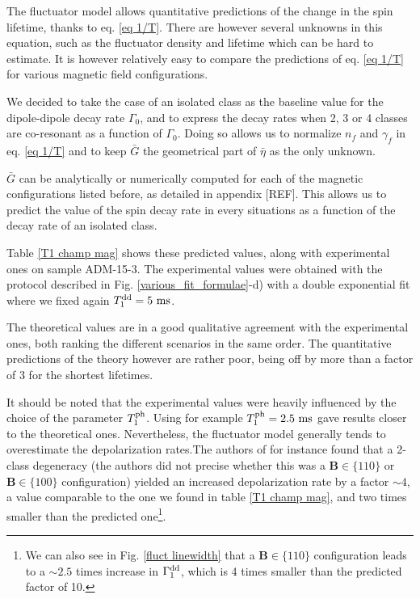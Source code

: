 \documentclass[a4paper, 11pt]{book}
\begin{document}
The fluctuator model allows quantitative predictions of the change in the spin lifetime, thanks to eq. \ref{eq 1/T}. There are however several unknowns in this equation, such as the fluctuator density and lifetime which can be hard to estimate. It is however relatively easy to compare the predictions of eq. \ref{eq 1/T} for various magnetic field configurations.

We decided to take the case of an isolated class as the baseline value for the dipole-dipole decay rate $\Gamma_0$, and to express the decay rates when 2, 3 or 4 classes are co-resonant as a function of $\Gamma_0$. Doing so allows us to normalize $n_f$ and $\gamma_f$ in eq. \ref{eq 1/T} and to keep $\bar G$ the geometrical part of $\bar \eta$ as the only unknown.

$\bar G$ can be analytically or numerically computed for each of the magnetic configurations listed before, as detailed in appendix [REF]. This allows us to predict the value of the spin decay rate in every situations as a function of the decay rate of an isolated class.

Table \ref{T1 champ mag} shows these predicted values, along with experimental ones on sample ADM-15-3. The experimental values were obtained with the protocol described in Fig. \ref{various_fit_formulae}-d) with a double exponential fit where we fixed again $T_1^{\rm dd}=5\ \rm ms$.

The theoretical values are in a good qualitative agreement with the experimental ones, both ranking the different scenarios in the same order. The quantitative predictions of the theory however are rather poor, being off by more than a factor of 3 for the shortest lifetimes.

It should be noted that the experimental values were heavily influenced by the choice of the parameter $T_1^{\rm ph}$. Using for example $T_1^{\rm ph}=2.5\ \rm ms$ gave results closer to the theoretical ones. Nevertheless, the fluctuator model generally tends to overestimate the depolarization rates.The authors of \citep{choi2017depolarization} for instance found that a 2-class degeneracy (the authors did not precise whether this was a $\mathbf{B} \in \{110\}$ or $\mathbf{B} \in \{100\}$ configuration) yielded an increased depolarization rate by a factor $\sim 4$, a value comparable to the one we found in table \ref{T1 champ mag}, and two times smaller than the predicted one\footnote{We can also see in Fig. \ref{fluct linewidth} that a $\mathbf{B} \in \{110\}$ configuration leads to a $\sim 2.5$ times increase in $\Gamma_1^{\rm dd}$, which is 4 times smaller than the predicted factor of 10.}.
\end{document}
